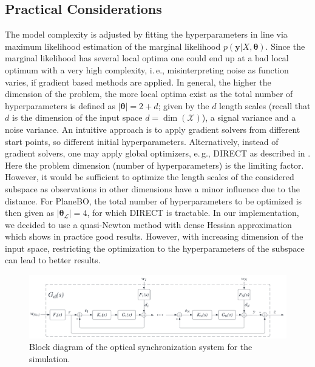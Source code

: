 \documentclass{ifacconf}
\newcommand{\eg}{e.\,g., }
\newcommand{\ie}{i.\,e., }
\newcommand{\linea}[1]{line\:{\footnotesize \textbf{(#1)}}}
\begin{document}
\subsection{Practical Considerations}
The model complexity is adjusted by fitting the hyperparameters in \linea{8} via maximum likelihood estimation of the marginal likelihood \(p(\bm{y}\vert X,\bm{\theta})\). Since the marginal likelihood has several local optima one could end up at a bad local optimum with a very high complexity, \ie misinterpreting noise as function varies, if gradient based methods are applied. In general, the higher the dimension of the problem, the more local optima exist as the total number of hyperparameters is defined as \(\lvert\bm{\theta}\lvert = 2+d\); given by the \(d\) length scales (recall that \(d\) is the dimension of the input space \(d = \dim(\mathcal{X})\)), a signal variance and a noise variance. An intuitive approach is to apply gradient solvers from different start points, so different initial hyperparameters. Alternatively, instead of gradient solvers, one may apply global optimizers, \eg DIRECT as described in \cite{direct}. Here the problem dimension (number of hyperparameters) is the limiting factor. However, it would be sufficient to optimize the length scales of the considered subspace as observations in other dimensions have a minor influence due to the distance. For PlaneBO, the total number of hyperparameters to be optimized is then given as \(\lvert\bm{\theta}_\mathcal{L}\rvert = 4\), for which DIRECT is tractable. In our implementation, we decided to use a quasi-Newton method with dense Hessian approximation which shows in practice good results. However, with increasing dimension of the input space, restricting the optimization to the hyperparameters of the subspace can lead to better results. 

\begin{figure}[htb]
    \centering
    \includegraphics[width = 0.9 \textwidth]{figs/lbsync21.pdf}
    \caption{Block diagram of the optical synchronization system for the simulation.}
    \label{fig:lbsync2}
\end{figure}
\end{document}
